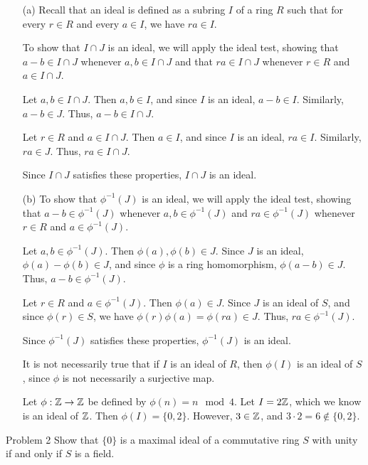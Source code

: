 \documentclass{hmwk}
\begin{document}
\begin{solution}
\begin{itemize}
    \item[(a)] 
    Recall that an ideal is defined as a subring $I$ of a ring $R$ such that for every $r \in R$ and every $a \in I$, we have $ra \in I$. 

    To show  that $I \cap J$ is an ideal, we will apply the ideal test, showing that $a - b \in I \cap J$ whenever $a, b \in I \cap J$ and  that $ra \in I \cap J$ whenever $r \in R$ and $a \in I \cap J$. 

    Let $a, b \in I \cap J$. Then $a, b \in I$, and since $I$ is an ideal, $a - b \in I$. Similarly, $a - b \in J$. Thus, $a - b \in I \cap J$.

    Let $r \in R$ and $a \in I \cap J$. Then $a \in I$, and since $I$ is an ideal, $ra \in I$. Similarly, $ra \in J$. Thus, $ra \in I \cap J$.

    Since $I \cap J$ satisfies these properties, $I \cap J$ is an ideal. 

    \item[(b)] To show that $\phi^{-1}(J)$ is an ideal, we will apply the ideal test, showing that $a - b \in \phi^{-1}(J)$ whenever $a, b \in \phi^{-1}(J)$ and $ra \in \phi^{-1}(J)$ whenever $r \in R$ and $a \in \phi^{-1}(J)$. 

    Let $a, b \in \phi^{-1}(J)$. Then $\phi(a), \phi(b) \in J$. Since $J$ is an ideal, $\phi(a) - \phi(b) \in J$, and since $\phi$ is a ring homomorphism, $\phi(a - b) \in J$. Thus, $a - b \in \phi^{-1}(J)$. 

    Let $r \in R$ and $a \in \phi^{-1}(J)$. Then $\phi(a) \in J$. Since $J$ is an ideal of $S$, and since $\phi(r) \in S$, we have $\phi(r)\phi(a) = \phi(ra) \in J$. Thus, $ra \in \phi^{-1}(J)$.

    Since $\phi^{-1}(J)$ satisfies these properties, $\phi^{-1}(J)$ is an ideal.

    It is not necessarily true that if $I$ is an ideal of $R$, then $\phi(I)$ is an ideal of $S$, since $\phi$ is not necessarily a surjective map. 

    Let $\phi: \mathbb{Z} \rightarrow \mathbb{Z}$ be defined by $\phi(n) = n \mod 4$. Let $I = 2\mathbb{Z}$, which we know is an ideal of $\mathbb{Z}$. Then $\phi(I) = \{0, 2\}$. However, $3 \in \mathbb{Z}$, and $3 \cdot 2 = 6 \notin \{0, 2\}$. 
\end{itemize}
\end{solution}

\begin{problem}{Problem 2}
    Show that $\{0\}$ is a maximal ideal of a commutative ring $S$ with unity if and only if $S$ is a field.  
\end{problem}
\end{document}
